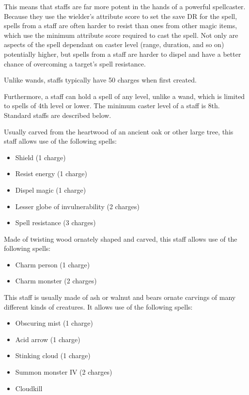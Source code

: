 This means that staffs are far more potent in the hands of a powerful spellcaster. Because they use the wielder's attribute score to set the save DR for the spell, spells from a staff are often harder to resist than ones from other magic items, which use the minimum attribute score required to cast the spell. Not only are aspects of the spell dependant on caster level (range, duration, and so on) potentially higher, but spells from a staff are harder to dispel and have a better chance of overcoming a target's spell resistance.

Unlike wands, staffs typically have 50 charges when first created.

Furthermore, a staff can hold a spell of any level, unlike a wand, which is limited to spells of 4th level or lower. The minimum caster level of a staff is 8th. Standard staffs are described below.

 Usually carved from the heartwood of an ancient oak or other large tree, this staff allows use of the following spells:
\begin{itemize}
\item Shield (1 charge)
\item Resist energy (1 charge)
\item Dispel magic (1 charge)
\item Lesser globe of invulnerability (2 charges)
\item Spell resistance (3 charges)
\end{itemize}


 Made of twisting wood ornately shaped and carved, this staff allows use of the following spells:
\begin{itemize}
\item Charm person (1 charge)
\item Charm monster (2 charges)
\end{itemize}


 This staff is usually made of ash or walnut and bears ornate carvings of many different kinds of creatures. It allows use of the following spells:
\begin{itemize}
\item Obscuring mist (1 charge)
\item Acid arrow (1 charge)
\item Stinking cloud (1 charge)
\item Summon monster IV (2 charges)
\item Cloudkill 
\end{itemize}

